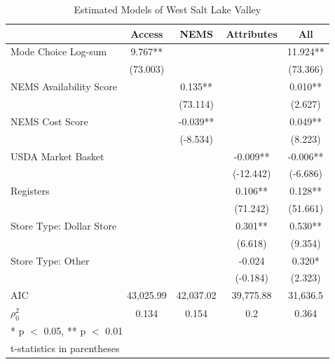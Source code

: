 \documentclass[
  letterpaper,
  authoryear,
  review,
  3p]{elsarticle}
\begin{document}
\hypertarget{tbl-sl-models}{}
\begin{table}
\caption{\label{tbl-sl-models}Estimated Models of West Salt Lake Valley }\tabularnewline

\centering
\begin{tabular}[t]{lcccc}
\toprule
  & Access & NEMS & Attributes & All\\
\midrule
Mode Choice Log-sum & 9.767** &  &  & 11.924**\\
 & (73.003) &  &  & (73.366)\\
NEMS Availability Score &  & 0.135** &  & 0.010**\\
 &  & (73.114) &  & (2.627)\\
NEMS Cost Score &  & -0.039** &  & 0.049**\\
 &  & (-8.534) &  & (8.223)\\
USDA Market Basket &  &  & -0.009** & -0.006**\\
 &  &  & (-12.442) & (-6.686)\\
Registers &  &  & 0.106** & 0.128**\\
 &  &  & (71.242) & (51.661)\\
Store Type: Dollar Store &  &  & 0.301** & 0.530**\\
 &  &  & (6.618) & (9.354)\\
Store Type: Other &  &  & -0.024 & 0.320*\\
 &  &  & (-0.184) & (2.323)\\
\midrule
AIC & 43,025.99 & 42,037.02 & 39,775.88 & 31,636.5\\
$\rho^2_0$ & 0.134 & 0.154 & 0.2 & 0.364\\
\bottomrule
\multicolumn{5}{l}{\rule{0pt}{1em}* p $<$ 0.05, ** p $<$ 0.01}\\
\multicolumn{5}{l}{\rule{0pt}{1em}t-statistics in parentheses}\\
\end{tabular}
\end{table}
\end{document}

